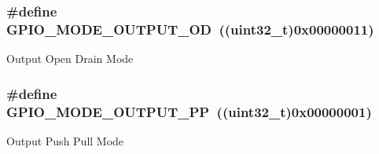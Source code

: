 \subsubsection[{\texorpdfstring{G\+P\+I\+O\+\_\+\+M\+O\+D\+E\+\_\+\+O\+U\+T\+P\+U\+T\+\_\+\+OD}{GPIO_MODE_OUTPUT_OD}}]{\setlength{\rightskip}{0pt plus 5cm}\#define G\+P\+I\+O\+\_\+\+M\+O\+D\+E\+\_\+\+O\+U\+T\+P\+U\+T\+\_\+\+OD~((uint32\+\_\+t)0x00000011)}\hypertarget{group___g_p_i_o__mode__define_ga2f91757829f6e9505ec386b840941929}{}\label{group___g_p_i_o__mode__define_ga2f91757829f6e9505ec386b840941929}
Output Open Drain Mode 
\subsubsection[{\texorpdfstring{G\+P\+I\+O\+\_\+\+M\+O\+D\+E\+\_\+\+O\+U\+T\+P\+U\+T\+\_\+\+PP}{GPIO_MODE_OUTPUT_PP}}]{\setlength{\rightskip}{0pt plus 5cm}\#define G\+P\+I\+O\+\_\+\+M\+O\+D\+E\+\_\+\+O\+U\+T\+P\+U\+T\+\_\+\+PP~((uint32\+\_\+t)0x00000001)}\hypertarget{group___g_p_i_o__mode__define_ga1013838a64cec2f8c88f079c449d1982}{}\label{group___g_p_i_o__mode__define_ga1013838a64cec2f8c88f079c449d1982}
Output Push Pull Mode 